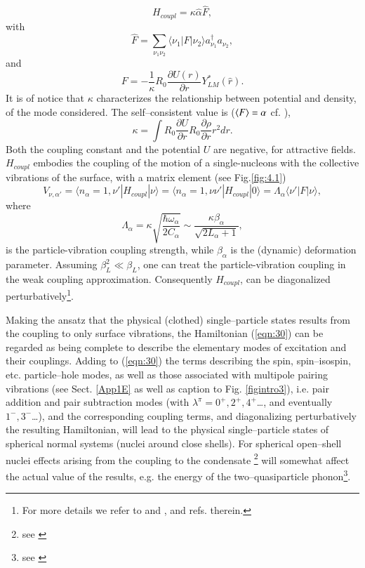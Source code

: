 \begin{equation}\label{eqintroD2}
H_{coupl} = \kappa \hat{\alpha} \hat{F} ,
\end{equation}
with
\begin{equation}
\hat{F} = \sum_{\nu_1 \nu_2} \langle \nu_1|F|\nu_2 \rangle a_{\nu_1}^{\dagger} a_{\nu_2} ,
\label{eqn:32}
\end{equation}
and
\begin{equation}
F = - \frac{1}{\kappa} R_0 \frac{\partial U(r)}{\partial r} Y_{LM}^* (\hat{r}) .
\label{eqn:33}
\end{equation}
It is of notice that $\kappa$ characterizes the relationship between potential and density, of the mode considered. The self--consistent value is ($\langle {F} \rangle=\alpha$ cf. \cite{Bohr:75}), 
\begin{equation}
\kappa=\int R_0\frac{\partial U}{\partial r}R_0\frac{\partial \rho}{\partial r}r^2dr.
\end{equation}
Both the coupling constant and the potential $U$ are negative, for attractive fields.
 $H_{coupl}$ embodies the coupling of the motion of a single-nucleons with the collective vibrations of the surface, with a matrix element (see Fig.\ref{fig:4.1})
\begin{equation}
V_{\nu,\alpha'}=\langle n_{\alpha} = 1, \nu' |H_{coupl}|\nu \rangle  = \langle n_{\alpha}=1, \nu\nu'|H_{coupl}|0 \rangle= \Lambda_{\alpha} \langle \nu' |F|\nu \rangle ,
\label{eqn:34}
\end{equation}
where
\begin{equation}\label{eqintroD6}
\Lambda_{\alpha} = \kappa \sqrt{\frac{\hbar\omega_{\alpha}}{2C_{\alpha}}} \sim \frac{\kappa \beta_{\alpha}}{\sqrt{2L_{\alpha}+1}} ,
\end{equation}
is the particle-vibration coupling strength, while $\beta_\alpha$ is the (dynamic) deformation parameter. Assuming $\beta_L^2 \ll \beta_L$, one can  treat the particle-vibration coupling in the weak coupling approximation. Consequently $H_{coupl}$, can be diagonalized perturbatively\footnote{For more details we refer to \cite{Bohr:75,Brink:05} and \cite{Bertsch:05}, and refs. therein.}.

Making the ansatz that the physical (clothed) single--particle states results from the coupling to only surface vibrations, the Hamiltonian (\ref{eqn:30}) can be regarded as being complete to describe the elementary modes of excitation and their couplings. Adding to (\ref{eqn:30}) the terms describing the spin, spin--isospin, etc. particle--hole modes, as well as those associated with multipole pairing vibrations (see Sect. \ref{App1E} as well as caption to Fig. \ref{figintro3}), i.e. pair addition and pair subtraction modes (with $\lambda^\pi=0^+,2^+,4^+$\dots, and eventually $1^-,3^-$\dots), and the corresponding coupling terms, and diagonalizing perturbatively the resulting Hamiltonian, will lead to the physical single--particle states of spherical normal systems (nuclei around close shells). For spherical open--shell nuclei effects arising from the coupling to the condensate \footnote{see \cite{Bes:90}} will somewhat  affect the actual value of the results, e.g. the energy of the two--quasiparticle phonon\footnote{see \cite{Barranco:04}}.  
